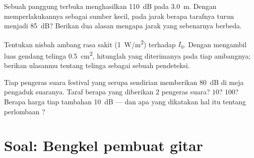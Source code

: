 \begin{exercise}[$\star\star\star$]\label{exo:g12:sound-acoustics:13}
Sebuah panggung terbuka menghasilkan \qty{110}{dB} pada \qty{3.0}{m}.
Dengan memperlakukannya sebagai sumber kecil, pada jarak berapa tarafnya
turun menjadi \qty{85}{dB}? Berikan dua alasan mengapa jarak yang
sebenarnya berbeda.
\end{exercise}

\begin{exercise}[$\star\star\star$]\label{exo:g12:sound-acoustics:14}
Tentukan nisbah ambang rasa sakit (\qty{1}{W/m^2}) terhadap $I_0$.
Dengan mengambil luas gendang telinga \qty{0.5}{cm^2}, hitunglah 
yang diterimanya pada tiap ambangnya; berikan ulasanmu tentang telinga
sebagai sebuah pendeteksi.
\end{exercise}

\begin{exercise}[$\star\star\star$]\label{exo:g12:sound-acoustics:15}
Tiap pengeras suara festival yang serupa sendirian memberikan
\qty{80}{dB} di meja pengaduk suaranya. Taraf berapa yang diberikan $2$
pengeras suara? $10$? $100$? Berapa harga tiap tambahan
\qty{+10}{dB} --- dan apa yang dikatakan hal itu tentang perlombaan
?
\end{exercise}

\section{Soal: Bengkel pembuat gitar}

